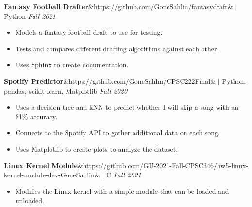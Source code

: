 \documentclass[11pt, a4paper, roman]{moderncv}
\newcommand{\project}[5]{
	\textbf{#1}\ifx&#2&{}
	\else
    		\href{#2}{\:\small\faGithub\:}\fi$|$ #3
	\hfill\textit{#4}
	#5
	\vspace{2mm}
}
\begin{document}
{\project{Fantasy Football Drafter}{https://github.com/GoneSahlin/fantasydraft}{Python}{Fall 2021}
	{\begin{itemize}
		\item Models a fantasy football draft to use for testing.
		\item Tests and compares different drafting algorithms against each other.
		\item Uses Sphinx to create documentation.
	\end{itemize}}
}
{\project{Spotify Predictor}{https://github.com/GoneSahlin/CPSC222Final}{Python, pandas, scikit-learn, Matplotlib}{Fall 2020}
	{\begin{itemize}
    		\item Uses a decision tree and kNN to predict whether I will skip a song with an 81\% accuracy.
    		\item Connects to the Spotify API to gather additional data on each song.
   		 \item Uses Matplotlib to create plots to analyze the dataset.
	\end{itemize}}
}
{\project{Linux Kernel Module}{https://github.com/GU-2021-Fall-CPSC346/hw5-linux-kernel-module-dev-GoneSahlin}{C}{Fall 2021}
	{\begin{itemize}
   		\item Modifies the Linux kernel with a simple module that can be loaded and unloaded.
	\end{itemize}}
}
\end{document}
